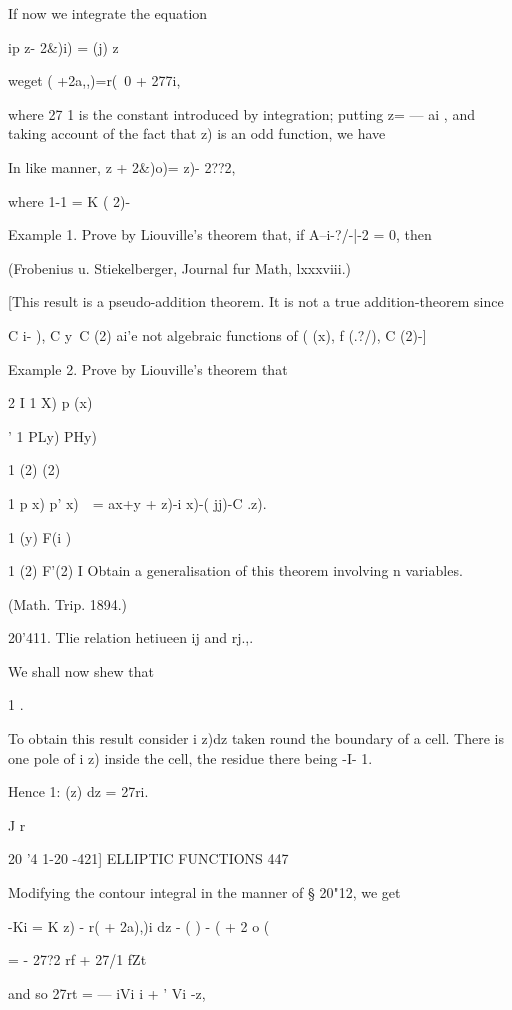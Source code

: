 {If now we integrate the equation

ip z- 2\&)i) = (j) z\

weget ( +2a,,)=r(~0 + 277i,

where 27 1 is the constant introduced by integration; putting z= — ai
, and taking account of the fact that z) is an odd function, we have

In like manner, z + 2\&)o)= z)- 2??2,

where 1-1 = K ( 2)-

Example 1. Prove by Liouville's theorem that, if A--i-?/-|-2 = 0, then

(Frobenius u. Stiekelberger, Journal fur Math, lxxxviii.)

[This result is a pseudo-addition theorem. It is not a true
addition-theorem since

C i- ), C y\ C (2) ai'e not algebraic functions of ( (x), f (.?/), C
(2)-]

Example 2. Prove by Liouville's theorem that



2 I 1 X) p (x)

' 1 PLy) PHy)

1 (2) (2)



1 p x) p' x)\ \ = ax+y + z)-i x)-( jj)-C .z).

1 (y) F(i )



1 (2) F'(2) I Obtain a generalisation of this theorem involving n
variables.

(Math. Trip. 1894.)

20'411. Tlie relation hetiueen ij and rj.,.

We shall now shew that

1 .

To obtain this result consider i z)dz taken round the boundary of a
cell. There is one pole of i z) inside the cell, the residue there
being -I- 1.

Hence 1: (z) dz = 27ri.

J r



20 '4 1-20 -421] ELLIPTIC FUNCTIONS 447

Modifying the contour integral in the manner of § 20"12, we get

 -Ki = K z) - r( + 2a),)i dz - ( ) - ( + 2 o (

= - 27?2 rf + 27/1 fZt

and so 27rt = — iVi i + ' Vi -z,

}
